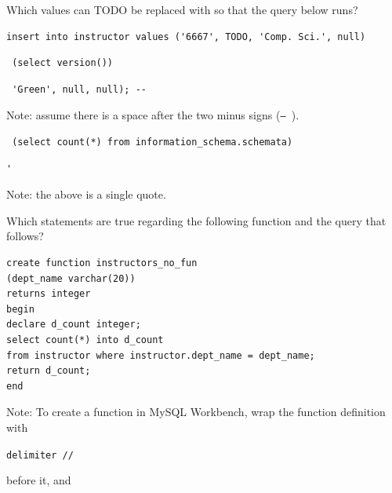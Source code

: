 \documentclass[12pt]{exam}
\begin{document}
\begin{questions}
\begin{minipage}{\linewidth}
\question[6]
Which values can TODO be replaced with so that the query below runs?\par\vspace{0.5em}
\begin{verbatim}
insert into instructor values ('6667', TODO, 'Comp. Sci.', null)
\end{verbatim}
\par\vspace{0.5em}
\begin{checkboxes}
    \CorrectChoice \begin{verbatim} (select version()) \end{verbatim}
    \CorrectChoice 
    \begin{verbatim} 'Green', null, null); -- \end{verbatim}
    \vspace{-0.5em}
    {\footnotesize Note: assume there is a space after the two minus signs (\texttt{-- }).}
    \CorrectChoice \begin{verbatim} (select count(*) from information_schema.schemata) \end{verbatim}
    \choice \begin{verbatim}'\end{verbatim}
    \vspace{-0.5em}
    {\footnotesize Note: the above is a single quote.}
\end{checkboxes}
\end{minipage}\vspace{1em}

\begin{minipage}{\linewidth}
\question[4]
Which statements are true regarding the following function and the query that follows?\par\vspace{0.5em}

\begin{verbatim}
create function instructors_no_fun
(dept_name varchar(20))
returns integer
begin
declare d_count integer;
select count(*) into d_count 
from instructor where instructor.dept_name = dept_name;
return d_count;
end
\end{verbatim}

{\footnotesize Note: To create a function in MySQL Workbench, wrap the function definition with

\texttt{delimiter //} 

before it, and 

}
\end{minipage}
\end{questions}
\end{document}
